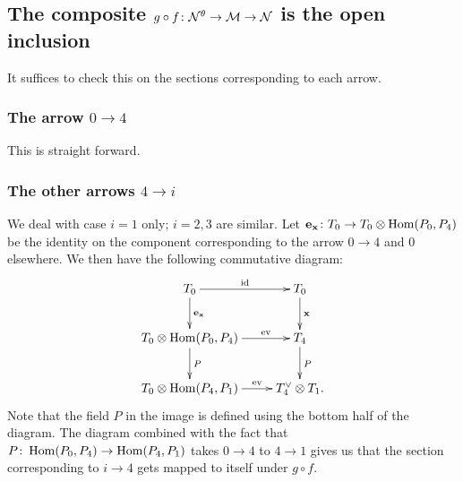 \documentclass{amsart}
\theoremstyle{definition}
\begin{document}



\subsection{The composite $g \circ f \colon \mathcal{N}^\theta \rightarrow \mathcal{M} \rightarrow \mathcal{N}$ is the open inclusion}

It suffices to check this on the sections corresponding to each arrow.

\subsubsection{The arrow $0 \rightarrow 4$}
This is straight forward.

\subsubsection{The other arrows $4 \rightarrow i$}
We deal with case $i=1$ only; $i=2,3$ are similar.
Let $\mathbf{e}_{\mathbf{x}} \colon T_0 \rightarrow  T_0 \otimes \operatorname{Hom}(P_0, P_4)$ be the identity on the component corresponding to the arrow $0 \rightarrow 4$ and 0 elsewhere.
We then have the following commutative diagram:
\begin{equation}
    \xymatrix{T_0 \ar[r]^{\text{id}} \ar[d]^{\bfe_\bfx} & T_0 \ar[d]^\bfx \\
    T_0 \otimes \Hom(P_0, P_4) \ar[r]^-{\text{ev}} \ar[d]^P & T_4 \ar[d]^P \\
    T_0 \otimes \Hom(P_4, P_1) \ar[r]^-{\text{ev}} &T_4^\vee \otimes T_1.
    }
\end{equation}
Note that the field $P$ in the image is defined using the bottom half of the diagram.
The diagram combined with the fact that $P \colon \operatorname{Hom}(P_0, P_4) \rightarrow \operatorname{Hom}(P_4, P_1)$ takes $0 \rightarrow 4$ to $4 \rightarrow 1$ gives us that the section corresponding to $i \rightarrow 4$ gets mapped to itself under $g \circ f$.
\end{document}
